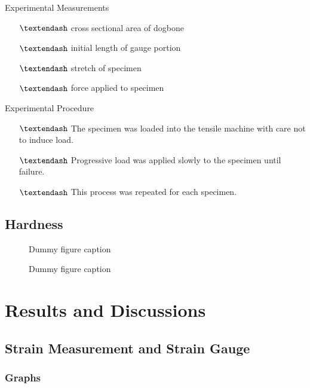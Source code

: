 \documentclass[a4paper,10pt]{article}
\begin{document}
Experimental  Measurements
\begin{itemize}
\item[$\textendash$] cross sectional area of dogbone
\item[$\textendash$] initial length of gauge portion
\item[$\textendash$] stretch of specimen
\item[$\textendash$] force applied to  specimen
\end{itemize}
Experimental  Procedure
\begin{itemize}
\item[$\textendash$] The specimen was loaded into the tensile machine with care not to induce load.
\item[$\textendash$] Progressive load was applied slowly to the specimen until failure.
\item[$\textendash$] This process was repeated for each specimen. 
\end{itemize}

\subsection{Hardness}
\begin{figure}[h]
  \caption{Dummy figure caption}
  \label{fig:dummy 1}
\end{figure}
\begin{figure}[h]
  \caption{Dummy figure caption}
  \label{fig:dummy 1}
\end{figure}



\section{Results and Discussions}
\subsection{Strain Measurement and Strain Gauge}
\subsubsection{Graphs}
\end{document}
